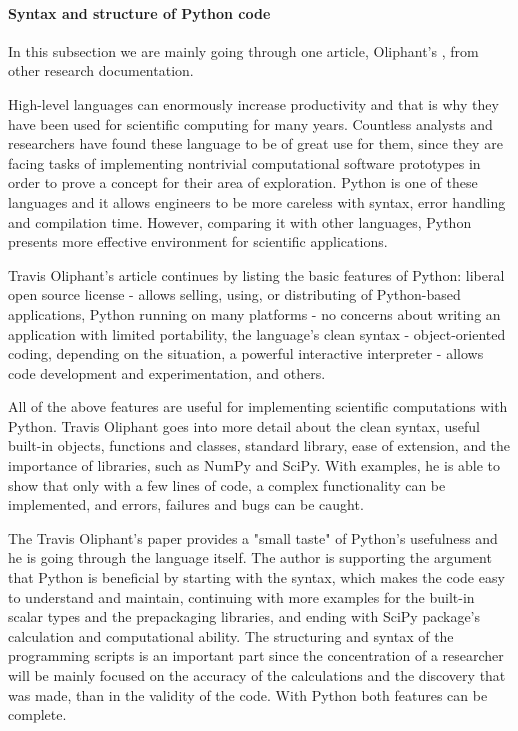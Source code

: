 \vspace{2mm}
\paragraph{Syntax and structure of Python code} 
\label{syntax}
\vspace{3mm}

In this subsection we are mainly going through one article, Oliphant's \cite{oliphant2007python}, from other research documentation. 

High-level languages can enormously increase productivity and that is why they have been used for scientific computing for many years. Countless analysts and researchers have found these language to be of great use for them, since they are facing tasks of implementing nontrivial computational software prototypes in order to prove a concept for their area of exploration. Python is one of these languages and it allows engineers to be more careless with syntax, error handling and compilation time. However, comparing it with other languages, Python presents more effective environment for scientific applications.

Travis Oliphant's article continues by listing the basic features of Python: liberal open source license - allows selling, using, or
distributing of Python-based applications, Python running on many platforms - no concerns about writing an application with limited portability, the language's clean syntax - object-oriented coding, depending on the situation, a powerful interactive interpreter - allows code development and experimentation, and others.\cite{oliphant2007python}

All of the above features are useful for implementing scientific computations with Python. Travis Oliphant goes into more detail about the clean syntax, useful built-in objects, functions and classes, standard library, ease of extension, and the importance of libraries, such as NumPy and SciPy. With examples, he is able to show that only with a few lines of code, a complex functionality can be implemented, and errors, failures and bugs can be caught. 

The Travis Oliphant's paper\cite{oliphant2007python} provides a "small taste" of Python's usefulness and he is going through the language itself. The author is supporting the argument that Python is beneficial by starting with the syntax, which makes the code easy to understand and maintain, continuing with more examples for the built-in scalar types and the prepackaging libraries, and ending with SciPy package's calculation and computational ability. The structuring and syntax of the programming scripts is an important part since the concentration of a researcher will be mainly focused on the accuracy of the calculations and the discovery that was made, than in the validity of the code. With Python both features can be complete. 

